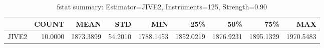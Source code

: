 \begin{table}[ht]
\centering
\caption{fstat summary: Estimator=JIVE2, Instruments=125, Strength=0.90}
\begin{tabular}{lrrrrrrrr}
\toprule
 & COUNT & MEAN & STD & MIN & 25\% & 50\% & 75\% & MAX \\
\midrule
JIVE2 & 10.0000 & 1873.3899 & 54.2010 & 1788.1453 & 1852.0219 & 1876.9231 & 1895.1329 & 1970.5483 \\
\bottomrule
\end{tabular}
\end{table}

